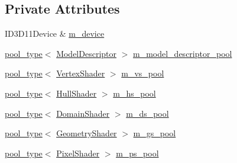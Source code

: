 \subsection*{Private Attributes}
\begin{DoxyCompactItemize}
\item 
I\+D3\+D11\+Device \& \hyperlink{classmage_1_1rendering_1_1_resource_manager_ad5233c9a748dcd828e5176ad5e8282c9}{m\+\_\+device}
\item 
\hyperlink{classmage_1_1rendering_1_1_resource_manager_ab21a4e280087032ee533f267bd9bf602}{pool\+\_\+type}$<$ \hyperlink{classmage_1_1rendering_1_1_model_descriptor}{Model\+Descriptor} $>$ \hyperlink{classmage_1_1rendering_1_1_resource_manager_a43db83f825b58a85c34e633d5807171d}{m\+\_\+model\+\_\+descriptor\+\_\+pool}
\item 
\hyperlink{classmage_1_1rendering_1_1_resource_manager_ab21a4e280087032ee533f267bd9bf602}{pool\+\_\+type}$<$ \hyperlink{classmage_1_1rendering_1_1_vertex_shader}{Vertex\+Shader} $>$ \hyperlink{classmage_1_1rendering_1_1_resource_manager_ac4af09e51fbbcfb534edb72d98033979}{m\+\_\+vs\+\_\+pool}
\item 
\hyperlink{classmage_1_1rendering_1_1_resource_manager_ab21a4e280087032ee533f267bd9bf602}{pool\+\_\+type}$<$ \hyperlink{namespacemage_1_1rendering_aa133f36cd1a81c87eedf962270a12f48}{Hull\+Shader} $>$ \hyperlink{classmage_1_1rendering_1_1_resource_manager_acea62c6cf52bd332ee3e0d1575c02e29}{m\+\_\+hs\+\_\+pool}
\item 
\hyperlink{classmage_1_1rendering_1_1_resource_manager_ab21a4e280087032ee533f267bd9bf602}{pool\+\_\+type}$<$ \hyperlink{namespacemage_1_1rendering_a02bd57ea68f48dd6e0d37a1362ad1ea2}{Domain\+Shader} $>$ \hyperlink{classmage_1_1rendering_1_1_resource_manager_a49ccc18bfbca9728857d820266c3acf6}{m\+\_\+ds\+\_\+pool}
\item 
\hyperlink{classmage_1_1rendering_1_1_resource_manager_ab21a4e280087032ee533f267bd9bf602}{pool\+\_\+type}$<$ \hyperlink{namespacemage_1_1rendering_accaa3591de8a0d7a2c72c1dcc0cf9592}{Geometry\+Shader} $>$ \hyperlink{classmage_1_1rendering_1_1_resource_manager_aa8fe17aa004cb46afc132a672bbb014d}{m\+\_\+gs\+\_\+pool}
\item 
\hyperlink{classmage_1_1rendering_1_1_resource_manager_ab21a4e280087032ee533f267bd9bf602}{pool\+\_\+type}$<$ \hyperlink{namespacemage_1_1rendering_a19905114913398d5073148f6c416e1b7}{Pixel\+Shader} $>$ \hyperlink{classmage_1_1rendering_1_1_resource_manager_a73f970f19438b2e2f02a5ede41e8faf4}{m\+\_\+ps\+\_\+pool}
\item 

\end{DoxyCompactItemize}
